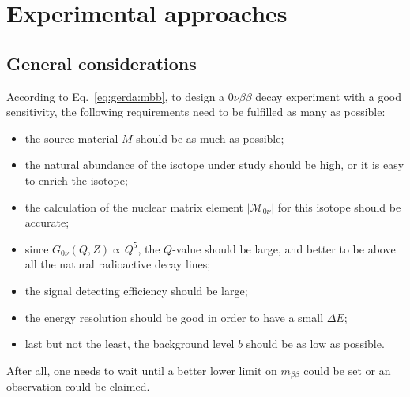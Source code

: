 \section{Experimental approaches}
\label{sec:exp:appr}
\subsection{General considerations}
\label{sec:gencon}
According to Eq.~\ref{eq:gerda:mbb}, to design a $0\nu\beta\beta$ decay experiment with a good sensitivity, the following requirements need to be fulfilled as many as possible:
\begin{itemize}
\item the source material $M$ should be as much as possible;
\item the natural abundance of the isotope under study should be high, or it is easy to enrich the isotope;
\item the calculation of the nuclear matrix element $|\mathcal{M}_{0\nu}|$ for this isotope should be accurate;
\item since $G_{0\nu}(Q,Z) \propto Q^{5}$, the $Q$-value should be large, and better to be above all the natural radioactive decay lines;
\item the signal detecting efficiency should be large;
\item the energy resolution should be good in order to have a small $\Delta E$;
\item last but not the least, the background level $b$ should be as low as possible.
\end{itemize}
After all, one needs to wait until a better lower limit on $m_{\beta\beta}$ could be set or an observation could be claimed.

